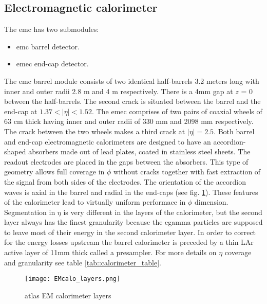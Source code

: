 	
	
        \subsection{Electromagnetic calorimeter }
        \label{emc}
        The \gls{emc} has two submodules:
        \begin{itemize}
        	\item \gls{emc} barrel detector.
        	\item \gls{emec} end-cap detector.
        \end{itemize}
        The \gls{emc} barrel module consists of two identical half-barrels 3.2 meters long with inner and outer radii 2.8 m and 4 m respectively. There is a 4mm gap at $z$ = 0 between the half-barrels. The second crack is situated between the barrel and the end-cap at $1.37 < |\eta| < 1.52$. The \gls{emec} comprises of two pairs of coaxial wheels of 63 cm thick having inner and outer radii of 330 mm and 2098 mm respectively. The crack between the two wheels makes a third crack at  $|\eta| = 2.5$.
        Both barrel and end-cap electromagnetic calorimeters are designed to have an accordion-shaped absorbers made out of lead plates, coated in stainless steel sheets. The readout electrodes are placed in the gaps between the absorbers. This type of geometry allows full coverage in $\phi$ without cracks together with fast extraction of the signal from both sides of the electrodes. The orientation of the accordion waves is axial in the barrel and radial in the end-caps (see fig. \ref{fig::calorimeter_layout}). These features of the calorimeter lead to virtually uniform performace in $\phi$ dimension. \\
        Segmentation in $\eta$  is very different in the layers of the calorimeter, but the second layer always has the finest granularity because the egamma particles are supposed to leave most of their energy in the second calorimeter layer. In order to correct for the energy losses upstream the barrel calorimeter is preceded by a thin LAr active layer of  11mm thick called a presampler. For more details on $\eta$ coverage and granularity see table \ref{tab::calorimeter_table}.

        \begin{figure}[htpb]
        	\texttt{[image: EMcalo\_layers.png]}
        	\caption{ \gls{atlas} EM calorimeter layers}
        	\label{fig::calorimeter_layout}
        \end{figure}
    
